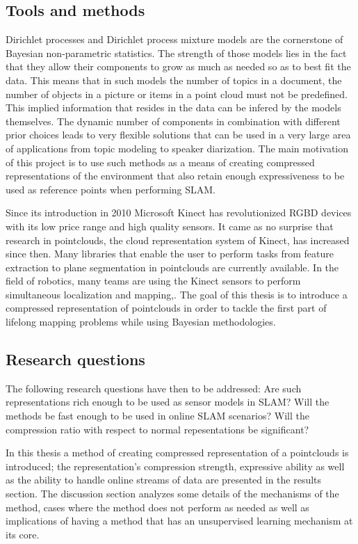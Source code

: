 \documentclass[twoside,hidelinks]{article}
\begin{document}
\subsection{Tools and methods}
Dirichlet processes and Dirichlet process mixture models \cite{nonParam} are the cornerstone of Bayesian non-parametric statistics. The strength of those models lies in the fact that they allow their components to grow as much as needed so as to best fit the data. This means that in such models the number of topics in a document, the number of objects in a picture or items in a point cloud must not be predefined. This implied information that resides in the data can be infered by the models themselves. The dynamic number of components in combination with different prior choices leads to very flexible solutions that can be used in a very large area of applications from topic modeling\cite{LDA} to speaker diarization\cite{speakerDiar}.
The main motivation of this project is to use such methods as a means of creating compressed representations of the environment that also retain enough expressiveness to be used as reference points when performing SLAM. 

Since its introduction in 2010 Microsoft Kinect\cite{kinect} has revolutionized RGBD devices with its low price range and high quality sensors. It came as no surprise that research in pointclouds, the cloud representation system of Kinect, has increased since then. Many libraries that enable the user to perform tasks from feature extraction to plane segmentation\cite{pcl} in pointclouds are currently available. In the field of robotics, many teams are using the Kinect sensors to perform simultaneous localization and mapping\cite{rtabmap},\cite{rgbdmapping}. The goal of this thesis is to introduce a compressed representation of pointclouds in order to tackle the first part of lifelong mapping problems while using Bayesian methodologies. 


\subsection{Research questions}


The following research questions have then to be addressed: Are such representations rich enough to be used as sensor models in SLAM?  Will the methods be fast enough to be used in online SLAM scenarios? Will the compression ratio with respect to normal repesentations be significant? 

In this thesis a method of creating compressed representation of a pointclouds is introduced; the representation's compression strength, expressive ability as well as the ability to handle online streams of data are presented in the results section. The discussion section analyzes some details of the mechanisms of the method, cases where the method does not perform as needed as well as implications of having a method that has an unsupervised learning mechanism at its core.
\end{document}
